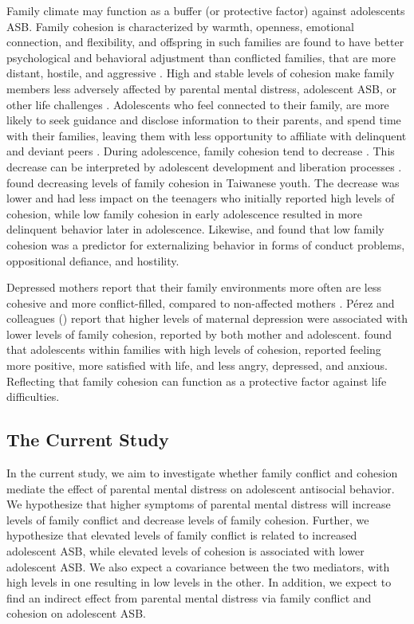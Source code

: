 \documentclass{sn-jnl}                  %
\begin{document}
Family climate may function as a buffer (or protective factor) against adolescents ASB. Family cohesion is characterized by warmth, openness, emotional connection, and flexibility, and offspring in such families are found to have better psychological and behavioral adjustment than conflicted families, that are more distant, hostile, and aggressive \citep{coe:2018, richmond:2006, sun:2021}. High and stable levels of cohesion make family members less adversely affected by parental mental distress, adolescent ASB, or other life challenges \citep{coe:2018}. Adolescents who feel connected to their family, are more likely to seek guidance and disclose information to their parents, and spend time with their families, leaving them with less opportunity to affiliate with delinquent and deviant peers \citep{fosco:2019, vieno:2009}. During adolescence, family cohesion tend to decrease \citep{dekovic:2003, lin:2019}. This decrease can be interpreted by adolescent development and liberation processes \citep{baer:2002}.  \citet{lin:2019} found decreasing levels of family cohesion in Taiwanese youth. The decrease was lower and had less impact on the teenagers who initially reported high levels of cohesion, while low family cohesion in early adolescence resulted in more delinquent behavior later in adolescence. Likewise, \citet{coe:2018} and \citet{richmond:2006} found that low family cohesion was a predictor for externalizing behavior in forms of conduct problems, oppositional defiance, and hostility.

Depressed mothers report that their family environments more often are less cohesive and more conflict-filled, compared to non-affected mothers \citep{slee:1996}. P{\'e}rez and colleagues (\citeyear{perez:2018}) report that higher levels of maternal depression were associated with lower levels of family cohesion, reported by both mother and adolescent. \citet{fosco:2020} found that adolescents within families with high levels of cohesion, reported feeling more positive, more satisfied with life, and less angry, depressed, and anxious. Reflecting that family cohesion can function as a protective factor against life difficulties.

\subsection{The Current Study}

In the current study, we aim to investigate whether family conflict and cohesion mediate the effect of parental mental distress on adolescent antisocial behavior. We hypothesize that higher symptoms of parental mental distress will increase levels of family conflict and decrease levels of family cohesion. Further, we hypothesize that elevated levels of family conflict is related to increased adolescent ASB, while elevated levels of cohesion is associated with lower adolescent ASB. We also expect a covariance between the two mediators, with high levels in one resulting in low levels in the other. In addition, we expect to find an indirect effect from parental mental distress via family conflict and cohesion on adolescent ASB.
\end{document}
